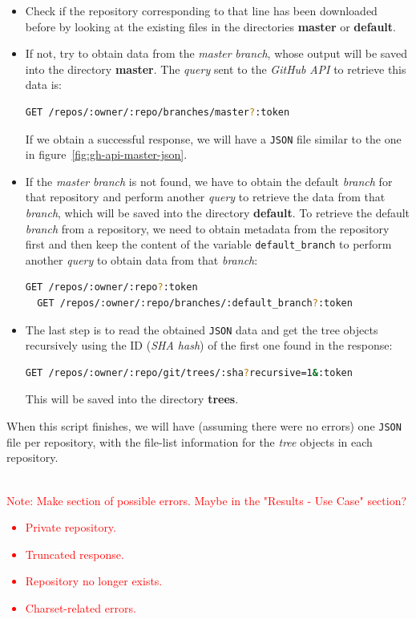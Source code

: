 \documentclass[a4paper, 12pt]{book}
\begin{document}
\begin{itemize}
  \item Check if the repository corresponding to that line has been downloaded before by looking at the existing files
  in the directories \textbf{master} or \textbf{default}.
  \item If not, try to obtain data from the \emph{master} \textit{branch}, whose output will be saved into the directory
  \textbf{master}.
  The \textit{query} sent to the \emph{GitHub} \textit{API} to retrieve this data is:
  \begin{lstlisting}[language=bash]
  GET /repos/:owner/:repo/branches/master?:token \end{lstlisting}
  If we obtain a successful response, we will have a \texttt{JSON} file similar to the one in figure~\ref{fig:gh-api-master-json}.
  \item If the \emph{master} \textit{branch} is not found, we have to obtain the default \textit{branch} for that repository and
  perform another \textit{query} to retrieve the data from that \textit{branch}, which will be saved into the directory \textbf{default}.
  To retrieve the default \textit{branch} from a repository, we need to obtain metadata from the repository first and then keep the content
  of the variable \texttt{default\_branch} to perform another \textit{query} to obtain data from that \textit{branch}:
  \begin{lstlisting}[language=bash]
  GET /repos/:owner/:repo?:token
  GET /repos/:owner/:repo/branches/:default_branch?:token \end{lstlisting}
  \item The last step is to read the obtained \texttt{JSON} data and get the tree objects recursively using the ID
  (\textit{SHA hash}) of the first one found in the response:
  \begin{lstlisting}[language=bash]
  GET /repos/:owner/:repo/git/trees/:sha?recursive=1&:token \end{lstlisting}
  This will be saved into the directory \textbf{trees}.
\end{itemize}
When this script finishes, we will have (assuming there were no errors) one \texttt{JSON} file per repository,
with the file-list information for the \textit{tree} objects in each repository.\\\\
\textcolor{red}{
Note: Make section of possible errors. Maybe in the "Results - Use Case" section?
\begin{itemize}
  \item Private repository.
  \item Truncated response.
  \item Repository no longer exists.
  \item Charset-related errors.
\end{itemize}}
\end{document}
